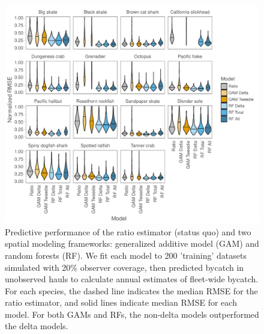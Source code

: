 \documentclass[]{article}
\begin{document}
\begin{figure}

{\centering \includegraphics[width=7in]{bycatch_sim_paper_files/figure-latex/model-comparison-delta-1} 

}

\caption{Predictive performance of the ratio estimator (status quo) and two spatial modeling frameworks: generalized additive model (GAM) and random forests (RF). We fit each model to 200 'training' datasets simulated with 20\% observer coverage, then predicted bycatch in unobserved hauls to calculate annual estimates of fleet-wide bycatch. For each species, the dashed line indicates the median RMSE for the ratio estimator, and solid lines indicate median RMSE for each model. For both GAMs and RFs, the non-delta models outperformed the delta models.}\label{fig:model-comparison-delta}
\end{figure}

\pagebreak
\end{document}
